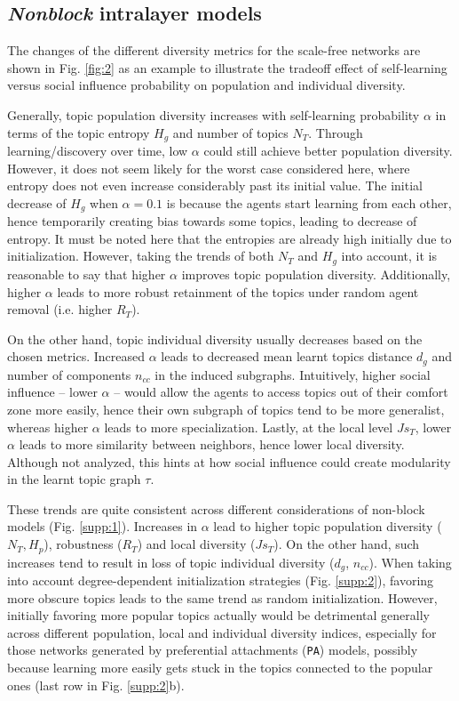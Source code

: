 \documentclass{svproc}
\begin{document}
\subsection{\textit{Nonblock} intralayer models} \label{results:nonblock}

The changes of the different diversity metrics for the scale-free networks are shown in Fig. \ref{fig:2} as an example to illustrate the tradeoff effect of self-learning versus social influence probability on population and individual diversity.

Generally, topic population diversity increases with self-learning probability $\alpha$ in terms of the topic entropy $H_g$ and number of topics $N_T$.
Through learning/discovery over time, low $\alpha$ could still achieve better population diversity.
However, it does not seem likely for the worst case considered here, where entropy does not even increase considerably past its initial value.
The initial decrease of $H_g$ when $\alpha = 0.1$ is because the agents start learning from each other, hence temporarily creating bias towards some topics, leading to decrease of entropy.
It must be noted here that the entropies are already high initially due to initialization.
However, taking the trends of both $N_T$ and $H_g$ into account, it is reasonable to say that higher $\alpha$ improves topic population diversity.
Additionally, higher $\alpha$ leads to more robust retainment of the topics under random agent removal (i.e. higher $R_T$).

On the other hand, topic individual diversity usually decreases based on the chosen metrics.
Increased $\alpha$ leads to decreased mean learnt topics distance $d_g$ and number of components $n_{cc}$ in the induced subgraphs.
Intuitively, higher social influence  -- lower $\alpha$ -- would allow the agents to access topics out of their comfort zone more easily, hence their own subgraph of topics tend to be more generalist, whereas higher $\alpha$ leads to more specialization.
Lastly, at the local level $Js_T$, lower $\alpha$ leads to more similarity between neighbors, hence lower local diversity.
Although not analyzed, this hints at how social influence could create modularity in the learnt topic graph $\tau$.

These trends are quite consistent across different considerations of non-block models (Fig. \ref{supp:1}).
Increases in $\alpha$ lead to higher topic population diversity ($N_T, H_p$), robustness ($R_T$) and local diversity ($Js_T$).
On the other hand, such increases tend to result in loss of topic individual diversity ($d_g$, $n_{cc}$).
When taking into account degree-dependent initialization strategies (Fig. \ref{supp:2}), favoring more obscure topics leads to the same trend as random initialization.
However, initially favoring more popular topics actually would be detrimental generally across different population, local and individual diversity indices, especially for those networks generated by preferential attachments (\texttt{PA}) models, possibly because learning more easily gets stuck in the topics connected to the popular ones (last row in Fig. \ref{supp:2}b).
\end{document}
